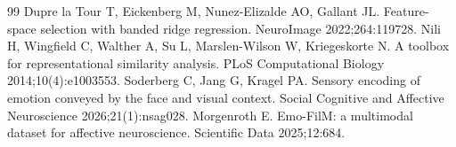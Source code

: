 \begin{thebibliography}{99}
 Dupre la Tour T, Eickenberg M, Nunez-Elizalde AO, Gallant JL. Feature-space selection with banded ridge regression. NeuroImage 2022;264:119728.
 Nili H, Wingfield C, Walther A, Su L, Marslen-Wilson W, Kriegeskorte N. A toolbox for representational similarity analysis. PLoS Computational Biology 2014;10(4):e1003553.
 Soderberg C, Jang G, Kragel PA. Sensory encoding of emotion conveyed by the face and visual context. Social Cognitive and Affective Neuroscience 2026;21(1):nsag028.
 Morgenroth E. Emo-FilM: a multimodal dataset for affective neuroscience. Scientific Data 2025;12:684.
\end{thebibliography}
